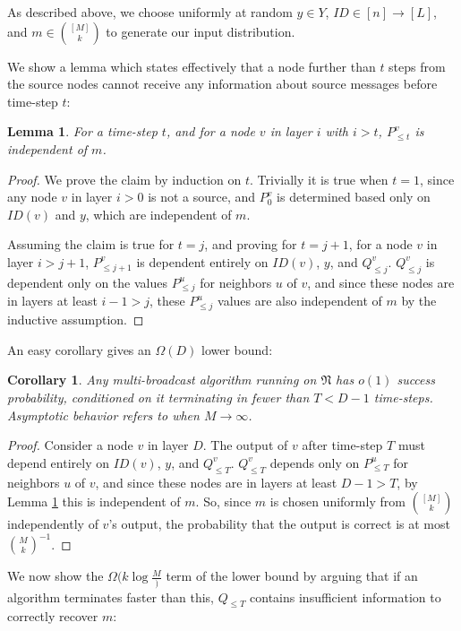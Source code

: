 \documentclass{article}
\newtheorem{corollary}[theorem]{Corollary}
\newtheorem{lemma}[theorem]{Lemma}
\newcommand{\net}{\ensuremath{\mathfrak{N}}\xspace}
\begin{document}
As described above, we choose uniformly at random $y \in Y$, $ID\in [n]\rightarrow [L]$, and $ m\in \binom{[M]}{k}$ to generate our input distribution.

We show a lemma which states effectively that a node further than $t$ steps from the source nodes cannot receive any information about source messages before time-step $t$:

\begin{lemma}\label{lem:indm}
	For a time-step $t$, and for a node $v$ in layer $i$ with $i>t$, $P^v_{\leq t}$ is independent of $m$.
\end{lemma}

\begin{proof}
	We prove the claim by induction on $t$. Trivially it is true when $t=1$, since any node $v$ in layer $i>0$ is not a source, and $P^v_{0}$ is determined based only on $ID(v)$ and $y$, which are independent of $m$. 
	
	Assuming the claim is true for $t=j$, and proving for $t=j+1$, for a node $v$ in layer $i>j+1$, $P^v_{\leq j+1}$ is dependent entirely on $ID(v)$, $y$, and $Q^v_{\leq j}$. $Q^v_{\leq j}$ is dependent only on the values $P^u_{\leq j}$ for neighbors $u$ of $v$, and since these nodes are in layers at least $i-1>j$, these $P^u_{\leq j}$ values are also independent of $m$ by the inductive assumption.
\end{proof}

An easy corollary gives an $\Omega(D)$ lower bound:

\begin{corollary}\label{cor:indm}
	Any multi-broadcast algorithm running on $\net$ has $o(1)$ success probability, conditioned on it terminating in fewer than $T<D-1$ time-steps. Asymptotic behavior refers to when $M\rightarrow\infty$.
\end{corollary}

\begin{proof}
	Consider a node $v$ in layer $D$. The output of $v$ after time-step $T$ must depend entirely on $ID(v)$, $y$, and $Q^v_{\leq T}$. $Q^v_{\leq T}$ depends only on $P^u_{\leq T}$ for neighbors $u$ of $v$, and since these nodes are in layers at least $D-1>T$, by Lemma \ref{lem:indm} this is independent of $m$. So, since $m$ is chosen uniformly from $\binom{[M]}{k}$ independently of $v$'s output, the probability that the output is correct is at most $\binom{M}{k}^{-1}$. 
\end{proof}

We now show the $\Omega(k \log \frac M)$ term of the lower bound by arguing that if an algorithm terminates faster than this, $Q_{\leq T}$ contains insufficient information to correctly recover $m$:
\end{document}
